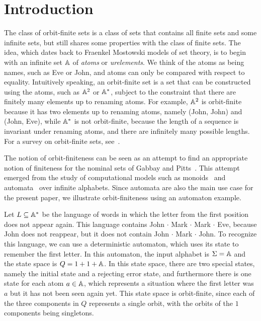 \section{Introduction}
The class of orbit-finite sets is a class of sets that contains all finite sets and some infinite sets, but still shares some properties with the class of finite sets.  The idea, which dates back to Fraenkel Mostowski models of set theory,  is to begin with an infinite set $\mathbb A$ of \emph{atoms} or \emph{urelements}. We think of the atoms as being names, such as Eve or John, and atoms can only be compared with respect to equality. Intuitively speaking, an  orbit-finite set is a set  that can be constructed using the atoms, such as $\mathbb A^2$ or $\mathbb A^*$, subject to the constraint that there are finitely many elements up to  renaming atoms. For example, $\mathbb A^2$ is orbit-finite because it has two elements up to renaming atoms, namely (John, John) and (John, Eve), while $\mathbb A^*$ is not orbit-finite, because the length of a sequence is invariant under renaming atoms, and there are infinitely many possible lengths. For a survey on orbit-finite sets, see~\cite{bojanczyk_slightly2018}.

The notion of orbit-finiteness can be seen as an attempt to find an appropriate notion of finiteness for the  nominal sets of Gabbay and Pitts~\cite{PittsAM:nomsns}.  This attempt emerged from the study of computational models such as monoids~\cite{bojanczykNominalMonoids2013} and automata~\cite{bojanczykAutomataTheoryNominal2014} over infinite alphabets. Since automata are also the main use case for the present paper, we illustrate orbit-finiteness using an automaton example. 

\begin{example}\label{ex:first-letter-repeats}
    Let  $L \subseteq \mathbb A^*$ be the language of  words in which the letter from the first position does not appear again. This language contains John $\cdot$ Mark $\cdot$ Mark $\cdot$ Eve, because John does not reappear, but it does not contain John $\cdot$ Mark $\cdot$ John. To recognize this language, we can use a deterministic automaton, which uses its state to remember the first letter. In this automaton, the input alphabet is $\Sigma = \mathbb A$ and  the state space is $Q = 1 + 1 + \mathbb A$. In this state space, there are two special states, namely the initial state and a rejecting error state, and furthermore there is one state for each atom $a \in \mathbb A$, which represents a situation where the first letter was $a$ but it has not been seen again yet. This state space is orbit-finite, since each of the three components in $Q$ represents a single orbit, with the orbits of the $1$ components being singletons.\exampleend
\end{example}

